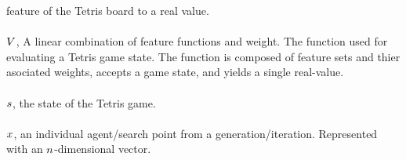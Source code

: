 feature of the Tetris board to a real value.\\
\\
$V$, A linear combination of feature functions and weight. 
The function used for evaluating a Tetris game state. The function is composed of feature sets and thier
asociated weights, accepts a game state, and yields a single real-value.\\
\\
$s$, the state of the Tetris game.\\
\\
$x$, an individual agent/search point from a generation/iteration. 
Represented with an $n$-dimensional vector.



